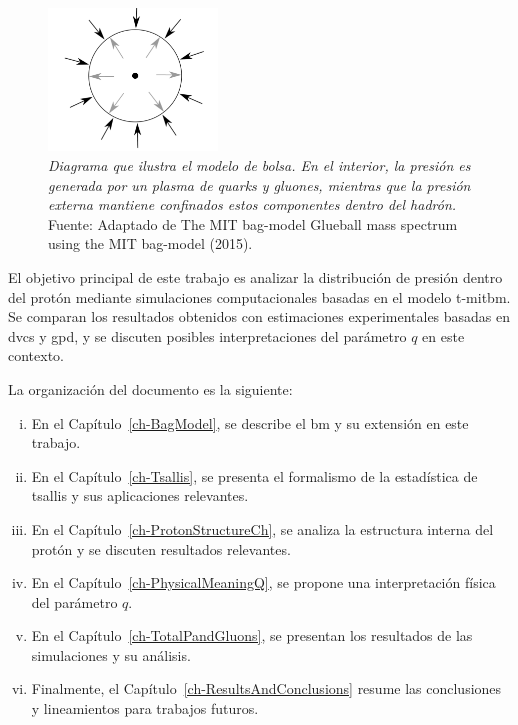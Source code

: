 \begin{figure}
    \centering
    \includegraphics[width=0.4\textwidth]{./Images/Bag model.png}
    \caption[Diagrama de bolsa]{\emph{Diagrama que ilustra el modelo de bolsa. En el interior, la presión es generada por un plasma de quarks y gluones, mientras que la presión externa mantiene confinados estos componentes dentro del hadrón.} Fuente: Adaptado de The MIT bag-model Glueball mass spectrum using the MIT bag-model (2015).}
    \label{fig:Bolsa }
\end{figure}

El objetivo principal de este trabajo es analizar la distribución de presión dentro del protón mediante simulaciones computacionales basadas en el modelo \gls{t-mitbm}. Se comparan los resultados obtenidos con estimaciones experimentales basadas en \gls{dvcs} y \gls{gpd}, y se discuten posibles interpretaciones del parámetro $q$ en este contexto.

La organización del documento es la siguiente:
\begin{enumerate}[i.]
    \item En el Capítulo~\ref{ch-BagModel}, se describe el \gls{bm} y su extensión en este trabajo.
    \item En el Capítulo~\ref{ch-Tsallis}, se presenta el formalismo de la estadística de \gls{tsallis} y sus aplicaciones relevantes.
    \item En el Capítulo~\ref{ch-ProtonStructureCh}, se analiza la estructura interna del protón y se discuten resultados relevantes.
    \item En el Capítulo~\ref{ch-PhysicalMeaningQ}, se propone una interpretación física del parámetro $q$.
    \item En el Capítulo~\ref{ch-TotalPandGluons}, se presentan los resultados de las simulaciones y su análisis.
    \item Finalmente, el Capítulo~\ref{ch-ResultsAndConclusions} resume las conclusiones y lineamientos para trabajos futuros.
\end{enumerate}

